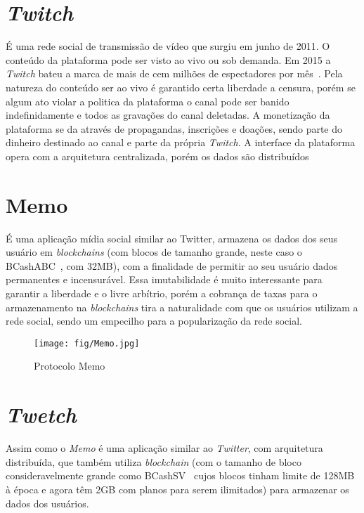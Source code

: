 
\section{\textit{Twitch}}

 É uma rede social de transmissão de vídeo que surgiu em junho de 2011. 
 O conteúdo da plataforma pode ser visto ao vivo ou sob demanda. 
 Em 2015 a \textit{Twitch} bateu a marca de mais de cem milhões de espectadores por mês~\cite{Twitch1}. Pela natureza do conteúdo ser ao vivo é garantido certa liberdade a censura, porém se algum ato violar a politica da plataforma o canal pode ser banido indefinidamente e todos as gravações do canal deletadas. A monetização da plataforma se da através de propagandas, inscrições e doações, sendo parte do dinheiro destinado ao canal e parte da própria \textit{Twitch}. A interface da plataforma opera com a arquitetura centralizada, porém os dados são distribuídos
 
\section{Memo}

É uma aplicação mídia social similar ao Twitter, armazena os dados dos seus usuário em \textit{blockchains} (com blocos de tamanho grande, neste caso o BCashABC~\cite{BTCABC}, com 32MB), com a finalidade de permitir ao seu usuário dados permanentes e incensurável.
Essa imutabilidade é muito interessante para garantir a liberdade e o livre arbítrio, porém a cobrança de taxas para o armazenamento na \textit{blockchains}  tira a naturalidade com que os usuários utilizam a rede social, sendo um empecilho para a popularização da rede social.
\begin{figure}[H]
\centering\texttt{[image: fig/Memo.jpg]}
\caption%
        {\label{fig:memo-protocol}Protocolo Memo~\cite{Memo1}}
\end{figure}

\section{\textit{Twetch}}
Assim como o \textit{Memo} é uma aplicação similar ao \textit{Twitter}, com arquitetura distribuída, que também utiliza \textit{blockchain} (com o tamanho de bloco consideravelmente grande como BCashSV~\cite{BTCSV} cujos blocos tinham limite de 128MB à época e agora têm 2GB com planos para serem ilimitados) para armazenar os dados dos usuários.

